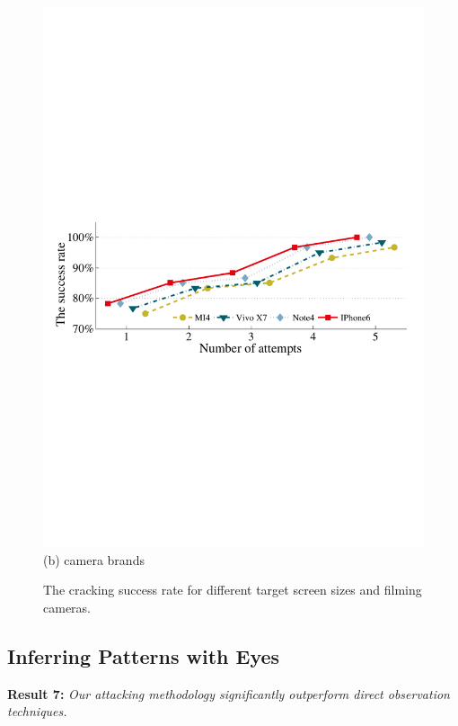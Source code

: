 \begin{figure}[!t]
{\begin{minipage}[t]{0.5\textwidth}
                \includegraphics[width=\textwidth]{fig/camera_brands.pdf}\\
                \centering \footnotesize (b) camera brands
             \end{minipage}
        }
        \caption{The cracking success rate for different target screen sizes and filming cameras. }
        \label{fig:screen_size}
    \end{figure}

    \subsection{Inferring Patterns with Eyes}

    \noindent \textbf{Result 7:} \emph{Our attacking methodology significantly outperform direct observation techniques.}

